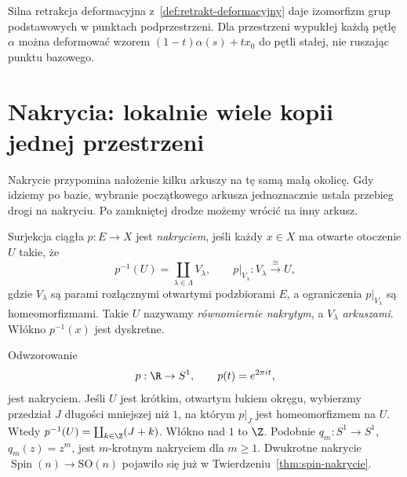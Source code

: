 Silna retrakcja deformacyjna
z~\ref{def:retrakt-deformacyjny} daje
izomorfizm grup podstawowych w punktach
podprzestrzeni. Dla przestrzeni wypukłej
każdą pętlę $\alpha$ można deformować
wzorem $(1-t)\alpha(s)+tx_0$ do pętli
stałej, nie ruszając punktu bazowego.

\section{Nakrycia: lokalnie wiele kopii jednej przestrzeni}
\label{sec:nakrycia}

Nakrycie przypomina nałożenie kilku arkuszy
na tę samą małą okolicę. Gdy idziemy po bazie,
wybranie początkowego arkusza jednoznacznie
ustala przebieg drogi na nakryciu.
Po zamkniętej drodze możemy wrócić na inny arkusz.

\begin{definicja}
\label{def:nakrycie}
Surjekcja ciągła $p:E\to X$ jest \emph{nakryciem},
jeśli każdy $x\in X$ ma otwarte otoczenie $U$
takie, że
\[
 p^{-1}(U)=\coprod_{\lambda\in\Lambda}V_\lambda,
 \qquad
 p|_{V_\lambda}:V_\lambda\xrightarrow{\cong}U,
\]
gdzie $V_\lambda$ są parami rozłącznymi
otwartymi podzbiorami $E$, a ograniczenia $p|_{V_\lambda}$
są homeomorfizmami.
Takie $U$ nazywamy \emph{równomiernie nakrytym},
a $V_\lambda$ \emph{arkuszami}.
Włókno $p^{-1}(x)$ jest dyskretne.
\end{definicja}

\begin{przyklad}
\label{prz:exp-nakrycie}
Odwzorowanie
\[
 p:\R\to S^1,\qquad p(t)=e^{2\pi i t},
\]
jest nakryciem. Jeśli $U$ jest krótkim,
otwartym łukiem okręgu, wybierzmy przedział
$J$ długości mniejszej niż $1$, na którym
$p|_J$ jest homeomorfizmem na $U$.
Wtedy $p^{-1}(U)=\coprod_{k\in\Z}(J+k)$.
Włókno nad $1$ to $\Z$.
Podobnie $q_m:S^1\to S^1$, $q_m(z)=z^m$,
jest $m$-krotnym nakryciem dla $m\geq1$.
Dwukrotne nakrycie $\operatorname{Spin}(n)
\to\mathrm{SO}(n)$ pojawiło się już w
Twierdzeniu~\ref{thm:spin-nakrycie}.
\end{przyklad}

